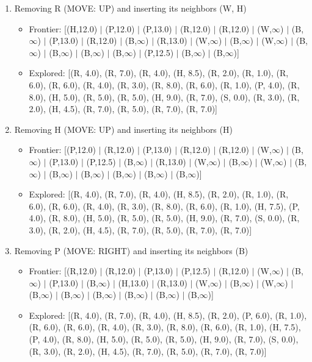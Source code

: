\documentclass[12pt]{article}
\begin{document}
\begin{enumerate}
\item Removing R (MOVE: UP) and inserting its neighbors (W, H)
\begin{itemize}
\item Frontier: [(H,12.0) \(|\) (P,12.0) \(|\) (P,13.0) \(|\) (R,12.0) \(|\) (R,12.0) \(|\) (W,\(\infty\)) \(|\) (B,\(\infty\)) \(|\) (P,13.0) \(|\) (R,12.0) \(|\) (B,\(\infty\)) \(|\) (R,13.0) \(|\) (W,\(\infty\)) \(|\) (B,\(\infty\)) \(|\) (W,\(\infty\)) \(|\) (B,\(\infty\)) \(|\) (B,\(\infty\)) \(|\) (B,\(\infty\)) \(|\) (B,\(\infty\)) \(|\) (P,12.5) \(|\) (B,\(\infty\)) \(|\) (B,\(\infty\))]
\item Explored: [(R, 4.0), (R, 7.0), (R, 4.0), (H, 8.5), (R, 2.0), (R, 1.0), (R, 6.0), (R, 6.0), (R, 4.0), (R, 3.0), (R, 8.0), (R, 6.0), (R, 1.0), (P, 4.0), (R, 8.0), (H, 5.0), (R, 5.0), (R, 5.0), (H, 9.0), (R, 7.0), (S, 0.0), (R, 3.0), (R, 2.0), (H, 4.5), (R, 7.0), (R, 5.0), (R, 7.0), (R, 7.0)]
\end{itemize}

\item Removing H (MOVE: UP) and inserting its neighbors (H)
\begin{itemize}
\item Frontier: [(P,12.0) \(|\) (R,12.0) \(|\) (P,13.0) \(|\) (R,12.0) \(|\) (R,12.0) \(|\) (W,\(\infty\)) \(|\) (B,\(\infty\)) \(|\) (P,13.0) \(|\) (P,12.5) \(|\) (B,\(\infty\)) \(|\) (R,13.0) \(|\) (W,\(\infty\)) \(|\) (B,\(\infty\)) \(|\) (W,\(\infty\)) \(|\) (B,\(\infty\)) \(|\) (B,\(\infty\)) \(|\) (B,\(\infty\)) \(|\) (B,\(\infty\)) \(|\) (B,\(\infty\)) \(|\) (B,\(\infty\))]
\item Explored: [(R, 4.0), (R, 7.0), (R, 4.0), (H, 8.5), (R, 2.0), (R, 1.0), (R, 6.0), (R, 6.0), (R, 4.0), (R, 3.0), (R, 8.0), (R, 6.0), (R, 1.0), (H, 7.5), (P, 4.0), (R, 8.0), (H, 5.0), (R, 5.0), (R, 5.0), (H, 9.0), (R, 7.0), (S, 0.0), (R, 3.0), (R, 2.0), (H, 4.5), (R, 7.0), (R, 5.0), (R, 7.0), (R, 7.0)]
\end{itemize}

\item Removing P (MOVE: RIGHT) and inserting its neighbors (B)
\begin{itemize}
\item Frontier: [(R,12.0) \(|\) (R,12.0) \(|\) (P,13.0) \(|\) (P,12.5) \(|\) (R,12.0) \(|\) (W,\(\infty\)) \(|\) (B,\(\infty\)) \(|\) (P,13.0) \(|\) (B,\(\infty\)) \(|\) (H,13.0) \(|\) (R,13.0) \(|\) (W,\(\infty\)) \(|\) (B,\(\infty\)) \(|\) (W,\(\infty\)) \(|\) (B,\(\infty\)) \(|\) (B,\(\infty\)) \(|\) (B,\(\infty\)) \(|\) (B,\(\infty\)) \(|\) (B,\(\infty\)) \(|\) (B,\(\infty\))]
\item Explored: [(R, 4.0), (R, 7.0), (R, 4.0), (H, 8.5), (R, 2.0), (P, 6.0), (R, 1.0), (R, 6.0), (R, 6.0), (R, 4.0), (R, 3.0), (R, 8.0), (R, 6.0), (R, 1.0), (H, 7.5), (P, 4.0), (R, 8.0), (H, 5.0), (R, 5.0), (R, 5.0), (H, 9.0), (R, 7.0), (S, 0.0), (R, 3.0), (R, 2.0), (H, 4.5), (R, 7.0), (R, 5.0), (R, 7.0), (R, 7.0)]
\end{itemize}


\end{enumerate}
\end{document}
